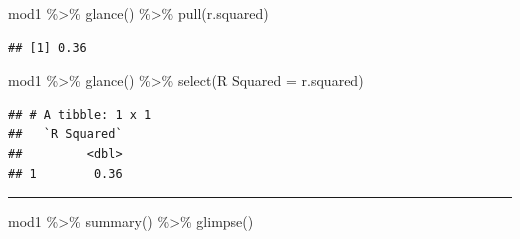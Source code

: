 \documentclass[
]{article}
\newenvironment{Shaded}{\begin{snugshade}}{\end{snugshade}}
\newcommand{\AttributeTok}[1]{\textcolor[rgb]{0.77,0.63,0.00}{#1}}
\newcommand{\FunctionTok}[1]{\textcolor[rgb]{0.00,0.00,0.00}{#1}}
\newcommand{\NormalTok}[1]{#1}
\newcommand{\OtherTok}[1]{\textcolor[rgb]{0.56,0.35,0.01}{#1}}
\newcommand{\SpecialCharTok}[1]{\textcolor[rgb]{0.00,0.00,0.00}{#1}}
\newcommand{\StringTok}[1]{\textcolor[rgb]{0.31,0.60,0.02}{#1}}
\begin{document}
\begin{Shaded}
\begin{Highlighting}[]
\NormalTok{mod1 }\SpecialCharTok{\%\textgreater{}\%} \FunctionTok{glance}\NormalTok{() }\SpecialCharTok{\%\textgreater{}\%} \FunctionTok{pull}\NormalTok{(r.squared)}
\end{Highlighting}
\end{Shaded}

\begin{verbatim}
## [1] 0.36
\end{verbatim}

\begin{Shaded}
\begin{Highlighting}[]
\NormalTok{mod1 }\SpecialCharTok{\%\textgreater{}\%} \FunctionTok{glance}\NormalTok{() }\SpecialCharTok{\%\textgreater{}\%} \FunctionTok{select}\NormalTok{(}\StringTok{\textasciigrave{}}\AttributeTok{R Squared}\StringTok{\textasciigrave{}} \OtherTok{=}\NormalTok{ r.squared)}
\end{Highlighting}
\end{Shaded}

\begin{verbatim}
## # A tibble: 1 x 1
##   `R Squared`
##         <dbl>
## 1        0.36
\end{verbatim}

\begin{center}\rule{0.5\linewidth}{0.5pt}\end{center}

\begin{Shaded}
\begin{Highlighting}[]
\NormalTok{mod1 }\SpecialCharTok{\%\textgreater{}\%} \FunctionTok{summary}\NormalTok{() }\SpecialCharTok{\%\textgreater{}\%} \FunctionTok{glimpse}\NormalTok{()}
\end{Highlighting}
\end{Shaded}
\end{document}
